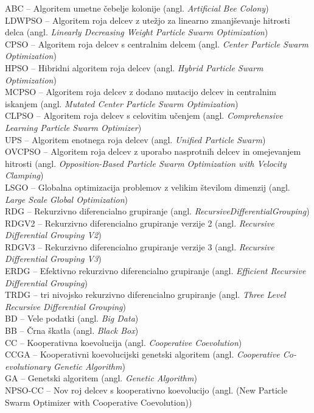 ABC -- Algoritem umetne čebelje kolonije (angl. \textit{Artificial Bee Colony}) \\
LDWPSO -- Algoritem roja delcev z utežjo za linearno zmanjševanje hitrosti delca (angl. \textit{Linearly Decreasing Weight Particle Swarm Optimization}) \\
CPSO -- Algoritem roja delcev s centralnim delcem (angl. \textit{Center Particle Swarm Optimization}) \\
HPSO -- Hibridni algoritem roja delcev (angl. \textit{Hybrid Particle Swarm Optimization}) \\
MCPSO -- Algoritem roja delcev z dodano mutacijo delcev in centralnim iskanjem (angl. \textit{Mutated Center Particle Swarm Optimization}) \\
CLPSO -- Algoritem roja delcev s celovitim učenjem (angl. \textit{Comprehensive Learning Particle Swarm Optimizer}) \\
UPS -- Algoritem enotnega roja delcev (angl. \textit{Unified Particle Swarm}) \\
OVCPSO -- Algoritem roja delcev z uporabo nasprotnih delcev in omejevanjem hitrosti (angl. \textit{Opposition-Based Particle Swarm Optimization with Velocity Clamping}) \\
LSGO -- Globalna optimizacija problemov z velikim številom dimenzij (angl. \textit{Large Scale Global Optimization}) \\
RDG -- Rekurzivno diferencialno grupiranje (angl. \textit{RecursiveDifferentialGrouping}) \\
RDGV2 -- Rekurzivno diferencialno grupiranje verzije 2 (angl. \textit{Recursive Differential Grouping V2}) \\
RDGV3 -- Rekurzivno diferencialno grupiranje verzije 3 (angl. \textit{Recursive Differential Grouping V3}) \\
ERDG -- Efektivno rekurzivno diferencialno grupiranje (angl. \textit{Efficient Recursive Differential Grouping}) \\
TRDG -- tri nivojsko rekurzivno diferencialno grupiranje (angl. \textit{Three Level Recursive Differential Grouping}) \\
BD -- Vele podatki (angl. \textit{Big Data}) \\
BB -- Črna škatla (angl. \textit{Black Box}) \\
CC -- Kooperativna koevolucija (angl. \textit{Cooperative Coevolution}) \\
CCGA -- Kooperativni koevolucijski genetski algoritem (angl. \textit{Cooperative Co-evolutionary Genetic Algorithm}) \\
GA -- Genetski algoritem (angl. \textit{Genetic Algorithm}) \\
NPSO-CC -- Nov roj delcev s kooperativno koevolucijo (angl. (New Particle Swarm Optimizer with Cooperative Coevolution))\\